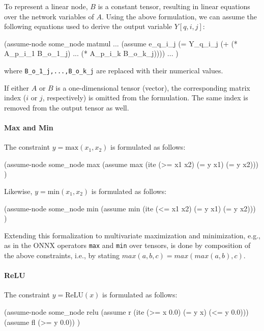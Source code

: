 To represent a linear node, $B$ is a constant tensor, resulting in linear equations over the network variables of $A$.
Using the above formulation, we can assume the following equations used to derive the output variable $Y[q,i,j]$:

\begin{code}[style=lbnf]
(assume-node some_node matmul
    ...
    (assume e_q_i_j (= Y_q_i_j (+ (* A_p_i_1 B_o_1_j) ... 
                                  (* A_p_i_k B_o_k_j))))
    ...
)    
\end{code} 

where \texttt{B\_o\_1\_j,...,B\_o\_k\_j} are replaced with their numerical values.

If either $A$ or $B$ is a one-dimensional tensor (vector), the corresponding matrix index ($i$ or $j$, respectively) is omitted from the formulation. The same index is removed from the output tensor as well.

\paragraph{Max and Min}
The constraint $y = \mathrm{max}(x_1,x_2)$ is formulated as follows: 
 
\begin{code}[style=lbnf]
(assume-node some_node max
    (assume max (ite (>= x1 x2) 
                     (= y x1) 
                     (= y x2))) 
)
\end{code}

Likewise, $y = \mathrm{min}(x_1,x_2)$ is formulated as follows: 

\begin{code}[style=lbnf]
(assume-node some_node min
    (assume min (ite (<= x1 x2) 
                     (= y x1) 
                     (= y x2))) 
)                     
\end{code}

Extending this formalization to multivariate maximization and minimization, 
e.g., as in the ONNX operators \texttt{max} and \texttt{min} over tensors,
is done by composition of the above constraints, i.e., by stating $max(a,b,c) = max(max(a,b),c)$.

\paragraph{ReLU} The constraint $y = \mathrm{ReLU}(x)$ is formulated as
follows: 

\begin{code}[style=lbnf]
(assume-node some_node relu
    (assume r (ite (>= x 0.0) 
                   (= y x) 
                   (<= y 0.0))) 
    (assume fl (>= y 0.0))
)    
\end{code}

